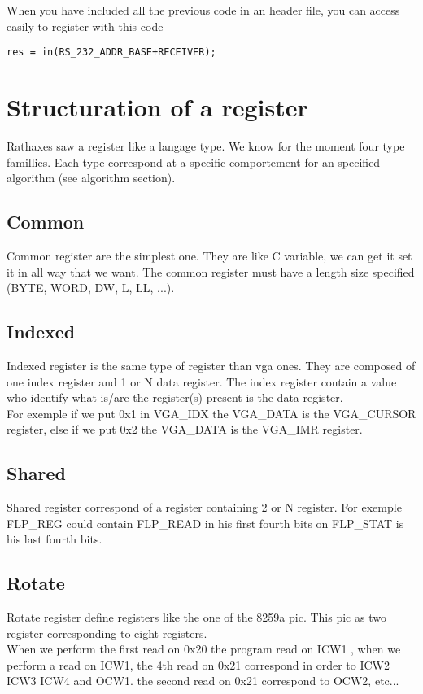 \documentclass[11pt]{report}
\begin{document}
When you have included all the previous code in an header file, you can access easily 
to register with this code
\begin{lstlisting}
res = in(RS_232_ADDR_BASE+RECEIVER);
\end{lstlisting}

\section{Structuration of a register}

Rathaxes saw a register like a langage type. We know for the moment four type famillies.
Each type correspond at a specific comportement for an specified algorithm (see algorithm 
section).

\subsection{Common}
Common register are the simplest one. They are like C variable, we can get it set it in 
all way that we want. The common register must have a length size specified (BYTE, WORD, 
DW, L, LL, ...).

\subsection{Indexed}
Indexed register is the same type of register than vga ones. They are composed of one index
register and 1 or N data register. The index register contain a value who identify what is/are 
the register(s) present is the data register.\\
For exemple if we put 0x1 in VGA\_IDX the VGA\_DATA is the VGA\_CURSOR register, else if we put
0x2 the VGA\_DATA is the VGA\_IMR register.

\subsection{Shared}
Shared register correspond of a register containing 2 or N register. For exemple FLP\_REG could 
contain FLP\_READ in his first fourth bits on FLP\_STAT is his last fourth bits.


\subsection{Rotate}
Rotate register define registers like the one of the 8259a pic. This pic as two register 
corresponding to eight registers. \\
When we perform the first read on 0x20 the program read on ICW1 , when we perform a read on
ICW1, the 4th read on 0x21 correspond in order to ICW2 ICW3 ICW4 and OCW1. the second read
on 0x21 correspond to OCW2, etc...
\end{document}
